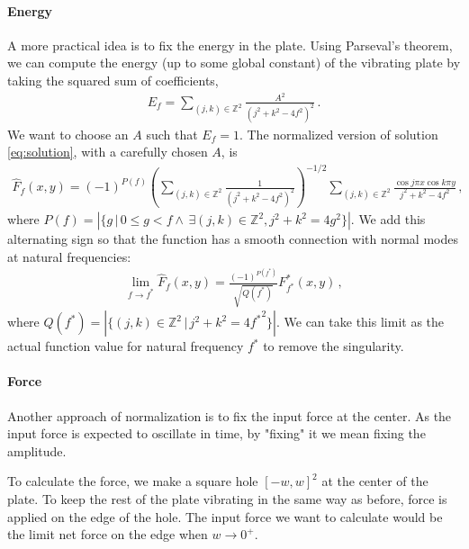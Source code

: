 \documentclass[]{article}
\begin{document}
\paragraph{Energy}
A more practical idea is to fix the energy in the plate. Using Parseval's theorem, we can compute the energy (up to some global constant) of the vibrating plate by taking the squared sum of coefficients,
\begin{align}
E_f = \sum_{(j, k)\in \mathbb{Z}^2} \frac{A^2}{(j^2+k^2-4f^2)^2}\,.
\end{align}
We want to choose an $A$ such that $E_f =1$. The normalized version of solution \eqref{eq:solution}, with a carefully chosen $A$, is
\begin{align}
\hat{F}_f(x, y) = (-1)^{P(f)}\left(\sum_{(j, k)\in \mathbb{Z}^2} \frac{1}{(j^2+k^2-4f^2)^2}\right)^{-1/2}\sum_{(j,k)\in\mathbb{Z}^2} \frac{\cos j\pi x \cos k\pi y}{j^2 + k^2 - 4f^2}\,,
\end{align}
where $P(f) = \left|\{g\,|\,0 \le g < f \land \,\exists (j, k)\in\mathbb{Z}^2, j^2+k^2=4g^2 \}\right|$. We add this alternating sign so that the function has a smooth connection with normal modes at natural frequencies:
\begin{align}
\lim_{f\to f^*}\hat{F}_f(x, y) = \frac{(-1)^{P(f^*)}}{\sqrt{Q(f^*)}} F^*_{f^*}(x, y)\,,
\end{align}
where $Q(f^*) = \left|\{(j,k)\in\mathbb{Z}^2\,|\,j^2+k^2=4{f^*}^2\}\right|$.
We can take this limit as the actual function value for natural frequency $f^*$ to remove the singularity.

\paragraph{Force}

Another approach of normalization is to fix the input force at the center. As the input force is expected to oscillate in time, by "fixing" it we mean fixing the amplitude.

To calculate the force, we make a square hole $[-w, w]^2$ at the center of the plate. To keep the rest of the plate vibrating in the same way as before, force is applied on the edge of the hole. The input force we want to calculate would be the limit net force on the edge when $w \to 0^+$.
\end{document}
